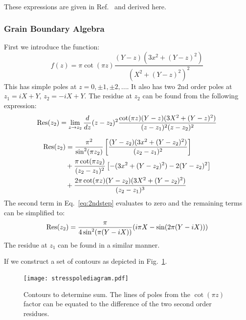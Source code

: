 These expressions are given in Ref.~\cite{sutton95} and derived here.

\subsubsection{Grain Boundary Algebra}
\label{gbalgebra}
First we introduce the function:
%
\begin{equation}
f(z) =  \pi\cot(\pi z)\frac{(Y-z)(3x^{2} + (Y-z)^{2})}{(X^{2} + (Y-z)^{2})^{2}}
\end{equation}
%
This has simple poles at $z = 0, \pm 1, \pm 2,...$. It also has two 2nd 
order poles at  $z_{1}=iX+Y$, $z_{2}=-iX+Y$. The residue at $z_{2}$ can
be found from the following expression: 
%
\begin{equation}
{\rm Res}(z_{2}) = \lim_{z\rightarrow z_{2}}\frac{d}{dz}(z-z_{2})^{2}
\frac{\cot(\pi z)(Y-z)(3X^{2}+(Y-z)^2)}{(z-z_{1})^{2}(z-z_{2})^{2}}
\end{equation}


\begin{align}
\label{eq:2ndstep}
{\rm Res}(z_{2})&=\frac{\pi^{2}}{\sin^{2}(\pi z_{2})}\left[\frac{(Y-z_{2})(3x^{2}+(Y-z_{2})^{2})}{(z_{2}-z_{1})^{2}}\right]\\
  &+\frac{\pi\cot(\pi z_{2})}{(z_{2}-z_{1})^{2}}\left[-(3x^{2} + (Y-z_{2})^{2})-2(Y-z_{2})^{2}\right] \\
  &+\frac{2\pi\cot(\pi z)(Y-z_{2})(3X^{2}+(Y-z_{2})^{2})}{(z_{2} - z_{1})^{3}}
\end{align}
%
The second term in Eq.~\ref{eq:2ndstep} evaluates to zero and the remaining terms can be simplified to:
%
\begin{equation}
{\rm Res}(z_{2}) = \frac{\pi}{4\sin^{2}(\pi(Y-iX))}(i\pi X - \sin(2\pi(Y-iX)))
\end{equation}
%
The residue at $z_{1}$ can be found in a similar manner.

If we construct a set of contours as depicted in Fig.~\ref{fig:polediagram}.
\begin{figure}[!tbp]
\begin{center}
\texttt{[image: stresspolediagram.pdf]}
\caption{Contours to determine sum. The lines of poles from the $\cot(\pi z)$ 
factor can be equated to the difference of the two 
second order residues.\label{fig:polediagram}}
\end{center}
\end{figure}


